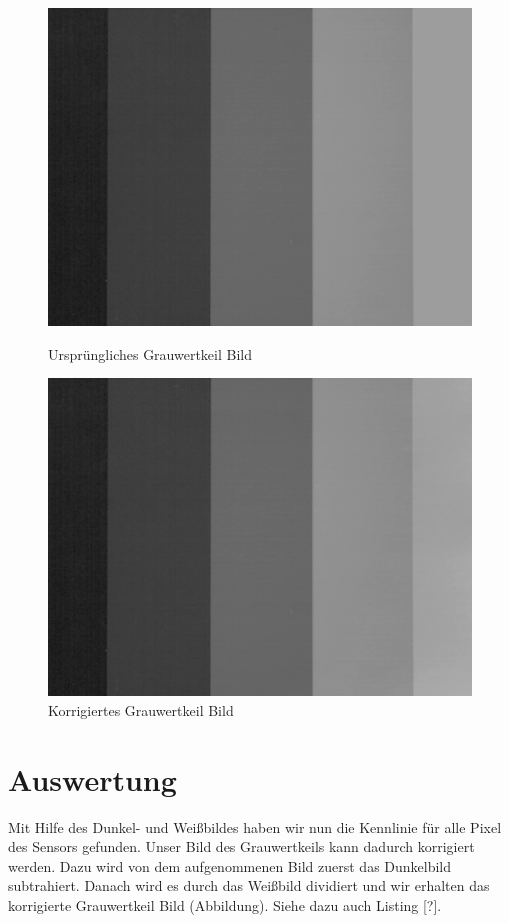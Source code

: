 \documentclass[12pt,oneside,a4paper]{report}
\begin{document}
\begin{figure}
\centering\small
\includegraphics[scale=0.6]{src/Grauwertkeil.png}
\caption{Ursprüngliches Grauwertkeil Bild}
\label{fig:GRAUWERT}
\centering\small
\includegraphics[scale=0.6]{src/KorrigierterGrauwertkeil.png}
\caption{Korrigiertes Grauwertkeil Bild}
\label{fig:GRAUWERT_KOR}
\end{figure}

\section{Auswertung}
\label{chap:VERSUCH_4_AUSWERTUNG}

Mit Hilfe des Dunkel- und Weißbildes haben wir nun die Kennlinie für alle Pixel des Sensors gefunden. Unser Bild des Grauwertkeils kann dadurch korrigiert werden. Dazu wird von dem aufgenommenen Bild zuerst das Dunkelbild subtrahiert. Danach wird es durch das Weißbild dividiert und wir erhalten das korrigierte Grauwertkeil Bild (Abbildung). Siehe dazu auch Listing [?].
\end{document}
